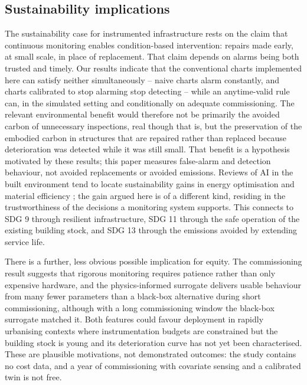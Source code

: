 \documentclass[12pt,a4paper]{article}
\newcommand{\rev}[1]{#1}
\newcommand{\rev}[1]{{\color{revcol}#1}}
\begin{document}
\subsection{Sustainability implications}\label{sec:sust}

The sustainability case for instrumented infrastructure rests on the claim that continuous monitoring enables condition-based intervention: repairs made early, at small scale, in place of replacement. That claim depends on alarms being both trusted and timely. Our results indicate that the conventional charts \rev{implemented here} can satisfy neither simultaneously -- naive charts alarm constantly, and charts calibrated to stop alarming stop detecting -- while an anytime-valid rule \rev{can, in the simulated setting and conditionally on adequate commissioning}. The relevant environmental benefit \rev{would} therefore \rev{not be} primarily the avoided carbon of unnecessary inspections, real though that is, but the preservation of the embodied carbon in structures that are repaired rather than replaced because deterioration was detected while it was still small. \rev{That benefit is a hypothesis motivated by these results; this paper measures false-alarm and detection behaviour, not avoided replacements or avoided emissions.} Reviews of AI in the built environment tend to locate sustainability gains in energy optimisation and material efficiency \citep{bibri2025aidt}; the gain argued here is of a different kind, residing in the trustworthiness of the decisions a monitoring system supports. This connects to SDG 9 through resilient infrastructure, SDG 11 through the safe operation of the existing building stock, and SDG 13 through the emissions avoided by extending service life.

There is a further, less obvious \rev{possible} implication for equity. The commissioning result \rev{suggests} that rigorous monitoring requires patience rather than \rev{only} expensive hardware, and the physics-informed surrogate delivers usable behaviour from many fewer parameters than a black-box alternative \rev{during short commissioning, although with a long commissioning window the black-box surrogate matched it}. Both features \rev{could} favour deployment in rapidly urbanising contexts where instrumentation budgets are constrained but the building stock is young and its deterioration curve has not yet been characterised. \rev{These are plausible motivations, not demonstrated outcomes: the study contains no cost data, and a year of commissioning with covariate sensing and a calibrated twin is not free.}
\end{document}
